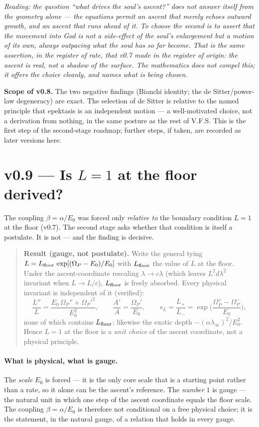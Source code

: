 \documentclass[11pt,a4paper]{article}
\newcommand{\note}[1]{\textcolor{black!65}{\emph{#1}}}
\theoremstyle{plain}
\theoremstyle{definition}
\theoremstyle{remark}
\begin{document}
\note{Reading: the question ``what drives the soul's ascent?'' does not answer itself from the geometry
alone --- the equations permit an ascent that merely echoes outward growth, and an ascent that runs
ahead of it. To choose the second is to assert that the movement into God is not a side-effect of the
soul's enlargement but a motion of its own, always outpacing what the soul has so far become. That is
the same assertion, in the register of rate, that v0.7 made in the register of origin: the ascent is
real, not a shadow of the surface. The mathematics does not compel this; it offers the choice cleanly,
and names what is being chosen.}

\textbf{Scope of v0.8.} The two negative findings (Bianchi identity; the de Sitter/power-law
degeneracy) are exact. The selection of de Sitter is relative to the named principle that epektasis is
an independent motion --- a well-motivated choice, not a derivation from nothing, in the same posture
as the rest of V.F.S. This is the first step of the second-stage roadmap; further steps, if taken, are
recorded as later versions here.

\FloatBarrier
\section*{v0.9 --- Is $L=1$ at the floor derived?}
The coupling $\beta=\alpha/E_0$ was forced only \emph{relative to} the boundary condition $L=1$ at the
floor (v0.7). The second stage asks whether that condition is itself a postulate. It is not --- and the
finding is decisive.

\begin{quote}
\textbf{Result (gauge, not postulate).} Write the general tying
$L=L_{\rm floor}\,\exp[(\Omega_P-E_0)/E_0]$ with $L_{\rm floor}$ the value of $L$ at the floor. Under
the ascent-coordinate rescaling $\lambda\to c\lambda$ (which leaves $L^2 d\lambda^2$ invariant when
$L\to L/c$), $L_{\rm floor}$ is freely absorbed. Every physical invariant is independent of it
(verified):
\[
\frac{L''}{L}=\frac{E_0\,\Omega_P''+\Omega_P'^2}{E_0^2},\qquad
\frac{A'}{A}=\frac{\Omega_P'}{E_0},\qquad
s_L=\frac{L_+}{L_-}=\exp\!\Big(\frac{\Omega_P^+-\Omega_P^-}{E_0}\Big),
\]
none of which contains $L_{\rm floor}$; likewise the exotic depth $-(\alpha\lambda_\infty)^2/E_0^2$. Hence $L=1$ at the floor
is a \emph{unit choice} of the ascent coordinate, not a physical principle.
\end{quote}

\paragraph{What is physical, what is gauge.} The \emph{scale} $E_0$ is forced --- it is the only core
scale that is a starting point rather than a rate, so it alone can be the ascent's reference. The
\emph{number} $1$ is gauge --- the natural unit in which one step of the ascent coordinate equals the
floor scale. The coupling $\beta=\alpha/E_0$ is therefore not conditional on a free physical choice; it
is the statement, in the natural gauge, of a relation that holds in every gauge.
\end{document}
